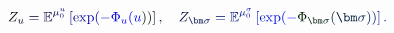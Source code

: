 \documentclass[12pt]{article}
\begin{document}
\makeatletter
\renewcommand*{\@textcolor}[3]{%
  \protect\leavevmode
  \begingroup
    \color#1{#2}#3%
  \endgroup
}
\makeatother
\begin{displaymath}
\mathcolor[RGB]{0,0,15}{Z} _ { \mathcolor[RGB]{0,0,30}{u} } \mathcolor[RGB]{0,0,45}{=} \mathbb { \mathcolor[RGB]{0,0,60}{E} } ^ { \mathcolor[RGB]{0,0,75}{\mu} _ { \mathcolor[RGB]{0,0,90}{0} } ^ { \mathcolor[RGB]{0,0,105}{u} } } \mathcolor[RGB]{0,0,120}{\left[} \mathrm { \mathcolor[RGB]{0,0,135}{e} \mathcolor[RGB]{0,0,150}{x} \mathcolor[RGB]{0,0,165}{p} } \mathcolor[RGB]{0,0,180}{(} \mathcolor[RGB]{0,0,195}{-} \mathcolor[RGB]{0,0,210}{\Phi} _ { \mathcolor[RGB]{0,0,225}{u} } \mathcolor[RGB]{0,0,240}{(} \mathcolor[RGB]{0,0,255}{u} \mathcolor[RGB]{0,15,0}{)} \mathcolor[RGB]{0,15,15}{)} \mathcolor[RGB]{0,15,30}{\right]} \mathcolor[RGB]{0,15,45}{,} \quad \mathcolor[RGB]{0,15,60}{Z} _ { \mathcolor[RGB]{0,15,75}{\bm} { \mathcolor[RGB]{0,15,90}{\sigma} } } \mathcolor[RGB]{0,15,105}{=} \mathbb { \mathcolor[RGB]{0,15,120}{E} } ^ { \mathcolor[RGB]{0,15,135}{\mu} _ { \mathcolor[RGB]{0,15,150}{0} } ^ { \mathcolor[RGB]{0,15,165}{\sigma} } } \mathcolor[RGB]{0,15,180}{\left[} \mathrm { \mathcolor[RGB]{0,15,195}{e} \mathcolor[RGB]{0,15,210}{x} \mathcolor[RGB]{0,15,225}{p} } \mathcolor[RGB]{0,15,240}{(} \mathcolor[RGB]{0,15,255}{-} \mathcolor[RGB]{0,30,0}{\Phi} _ { \mathcolor[RGB]{0,30,15}{\bm} { \mathcolor[RGB]{0,30,30}{\sigma} } } \mathcolor[RGB]{0,30,45}{(} \mathcolor[RGB]{0,30,60}{\bm} { \mathcolor[RGB]{0,30,75}{\sigma} } \mathcolor[RGB]{0,30,90}{)} \mathcolor[RGB]{0,30,105}{)} \mathcolor[RGB]{0,30,120}{\right]} \mathcolor[RGB]{0,30,135}{.}
\end{displaymath}
\end{document}
